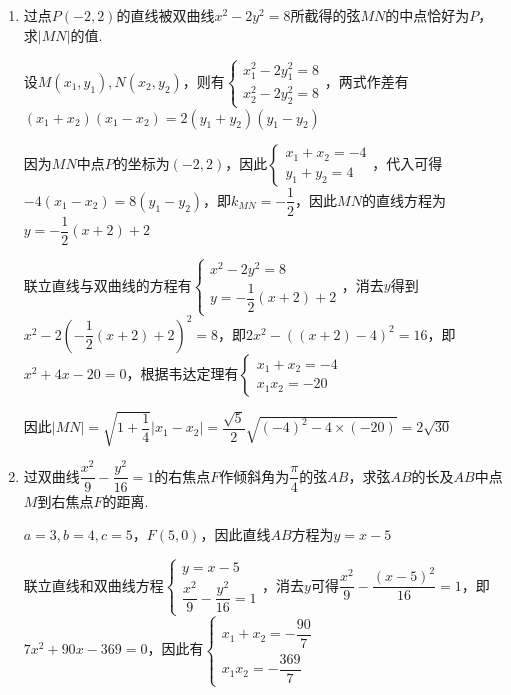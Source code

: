 \begin{enumerate}
\begin{enumerate}
\begin{jieda}
            弦长$l = \sqrt{1+k^2}|x_1 - x_2| = \sqrt{10}\sqrt{\left(-\dfrac{18}{5}\right)^2 - 4 \times \dfrac{13}{5}} = \dfrac{8\sqrt{10}}{5}$
        \end{jieda}
        \item 过点$P(-2, 2)$的直线被双曲线$x^2-2y^2 = 8$所截得的弦$MN$的中点恰好为$P$，求$|MN|$的值.
        \begin{jieda}
            设$M(x_1, y_1), N(x_2, y_2)$，则有$\left\{\begin{array}{l}
                 x_1^2-2y_1^2 = 8 \\
                 x_2^2-2y_2^2 = 8
            \end{array}\right.$，两式作差有$(x_1+x_2)(x_1-x_2) = 2(y_1+y_2)(y_1-y_2)$

            因为$MN$中点$P$的坐标为$(-2, 2)$，因此$\left\{\begin{array}{l}
                 x_1+x_2 = -4 \\
                 y_1+y_2 = 4
            \end{array}\right.$，代入可得$-4(x_1-x_2) = 8(y_1-y_2)$，即$k_{MN} = -\dfrac{1}{2}$，因此$MN$的直线方程为$y = -\dfrac{1}{2}(x+2)+2$

            联立直线与双曲线的方程有$\left\{\begin{array}{l}
                 x^2-2y^2 = 8 \\
                 y = -\dfrac{1}{2}(x+2)+2
            \end{array}\right.$，消去$y$得到$x^2-2\left(-\dfrac{1}{2}(x+2)+2\right)^2 = 8$，即$2x^2-\left((x+2)-4\right)^2 = 16$，即$x^2+4x-20=0$，根据韦达定理有$\left\{\begin{array}{l}
                 x_1+x_2 = -4 \\
                 x_1x_2 = -20
            \end{array}\right.$
            
            因此$|MN| = \sqrt{1+\dfrac{1}{4}}|x_1-x_2| = \dfrac{\sqrt{5}}{2}\sqrt{\left(-4 \right)^2 - 4 \times (-20)} = 2\sqrt{30}$
        \end{jieda}
        
        \item 过双曲线$\dfrac{x^2}{9}-\dfrac{y^2}{16} = 1$的右焦点$F$作倾斜角为$\dfrac{\pi}{4}$的弦$AB$，求弦$AB$的长及$AB$中点$M$到右焦点$F$的距离.
        \begin{jieda}
            $a = 3, b = 4, c = 5$，$F(5, 0)$，因此直线$AB$方程为$y = x - 5$

            联立直线和双曲线方程$\left\{\begin{array}{l}
                 y = x - 5 \\
                 \dfrac{x^2}{9}-\dfrac{y^2}{16} = 1
            \end{array}\right.$，消去$y$可得$\dfrac{x^2}{9}-\dfrac{(x - 5)^2}{16} = 1$，即$7x^2+90x-369 = 0$，因此有$\left\{\begin{array}{l}
                 x_1+x_2 = -\dfrac{90}{7} \\
                 x_1x_2 = -\dfrac{369}{7}
            \end{array}\right.$


\end{jieda}
\end{enumerate}
\end{enumerate}
